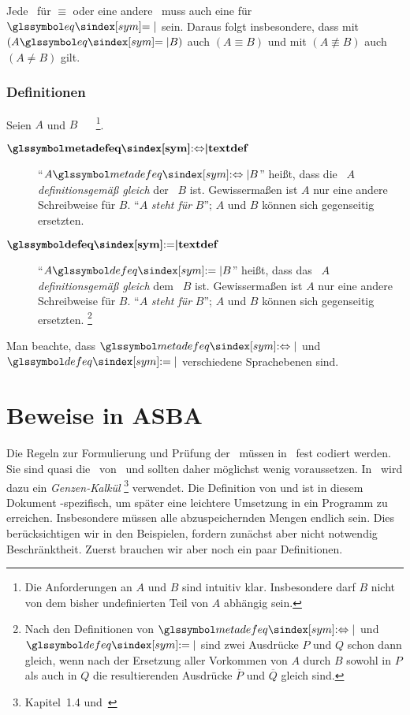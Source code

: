 Jede \interessierendeEigenschaft\ für $\equiv$ oder eine andere \Aequivalenz\ muss auch eine für $\symeq$ sein.
Daraus folgt insbesondere, dass mit $(A \symeq B)$ auch $(A \equiv B)$ und mit $(A \nequiv B)$ auch $(A \ne B)$ gilt.

\subsubsection{Definitionen}%
\label{subsub:Definitionen}

Seien $A$ und $B$ \Aussagen\ \textbzw\ \Objekte%
\footnote{%
	Die Anforderungen an $A$ und $B$ sind intuitiv klar.
	Insbesondere darf $B$ nicht von dem bisher undefinierten Teil von $A$ abhängig sein.
}.
\begin{description}
	\item[$\definition{\symmetadefeq}$]  \label{def:Metadefinition}
	\enquote{$A \symmetadefeq B$} heißt, dass die \Aussage\ $A$ \emph{definitionsgemäß gleich} der \Aussage\ $B$ ist.
	Gewissermaßen ist $A$ nur eine andere Schreibweise für $B$.
	\enquote{$A$ \emph{steht für} $B$}; $A$ und $B$ können sich gegenseitig ersetzten.
	\item[$\definition{\symdefeq}$]  \label{def:Definition}
	\enquote{$A \symdefeq B$} heißt, dass das \Objekt\ $A$ \emph{definitionsgemäß gleich} dem \Objekt\ $B$ ist.
	Gewissermaßen ist $A$ nur eine andere Schreibweise für $B$.
	\enquote{$A$ \emph{steht für} $B$}; $A$ und $B$ können sich gegenseitig ersetzten.%
	\footnote{%
		Nach den Definitionen von $\symmetadefeq$ und $\symdefeq$ sind zwei Ausdrücke $P$ und $Q$ schon dann gleich, wenn nach der Ersetzung aller Vorkommen von $A$ durch $B$ sowohl in $P$ als auch in $Q$ die resultierenden Ausdrücke $\overline{P}$ und $\overline{Q}$ gleich sind.
	}
\end{description}
Man beachte, dass $\symmetadefeq$ und $\symdefeq$ verschiedene Sprachebenen sind.

\section{Beweise in ASBA}%
\label{sec:BeweiseASBA}

Die Regeln zur Formulierung und Prüfung der \Beweise\ müssen in \ASBA\ fest codiert werden.
Sie sind quasi die \Axiome\ von \ASBA\ und sollten daher möglichst wenig voraussetzen.
In \ASBA\ wird dazu ein \emph{Genzen-Kalkül}%
\footnote{%
	 Kapitel~1.4 und~\cite{bib:Schlussregel,bib:NatuerlichesSchliessen}
} verwendet.
Die Definition von \emph{\Schlussregel} und \emph{\Beweis} ist in diesem Dokument \ASBA-spezifisch, um später eine leichtere Umsetzung in ein Programm zu erreichen.
Insbesondere müssen alle abzuspeichernden Mengen endlich sein.
Dies berücksichtigen wir in den Beispielen, fordern zunächst aber nicht notwendig Beschränktheit.
Zuerst brauchen wir aber noch ein paar Definitionen.

